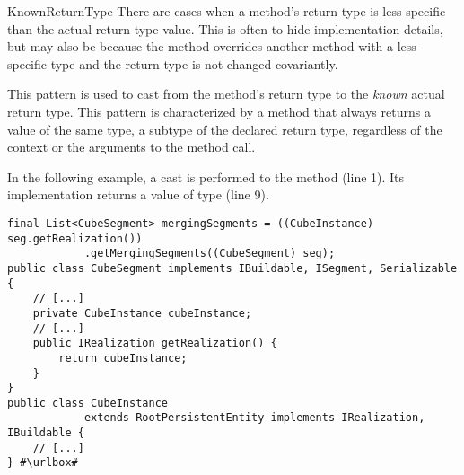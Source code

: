 \begin{pattern}{KnownReturnType}
There are cases when a method's return type is less specific than the
actual return type value.
This is often to hide implementation details, but may also be because the
  method overrides another method with a less-specific type
  and the return type is not changed covariantly.

This pattern is used to cast from the method's return type to
the \emph{known} actual return type.
This pattern is characterized by a method that always returns a
value of the same type, a subtype of the declared return type,
regardless of the context or the arguments to the method call.

\instances{}
In the following example,
a cast is performed to the  method (line 1).
Its implementation returns a value of type  (line 9).

\def\urlvar{http://bit.ly/apache_kylin_2SIjooO}
\begin{verbatim}
final List<CubeSegment> mergingSegments = ((CubeInstance) seg.getRealization())
            .getMergingSegments((CubeSegment) seg);
public class CubeSegment implements IBuildable, ISegment, Serializable {
    // [...]
    private CubeInstance cubeInstance;
    // [...]
    public IRealization getRealization() {
        return cubeInstance;
    }
}
public class CubeInstance
            extends RootPersistentEntity implements IRealization, IBuildable {
    // [...]
} #\urlbox#
\end{verbatim}



\end{pattern}
